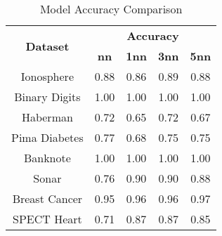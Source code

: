 \begin{table}[htbp]
\caption{Model Accuracy Comparison}
\begin{center}
\begin{tabular}{|c|c|c|c|c|}
\hline
\multirow{2}{*}{\textbf{Dataset}} & \multicolumn{4}{c|}{\textbf{Accuracy}} \\ \cline{2-5}
 & \textbf{nn} & \textbf{1nn} & \textbf{3nn} & \textbf{5nn} \\ \hline
Ionosphere & 0.88 & 0.86 & 0.89 & 0.88 \\ \hline
Binary Digits & 1.00 & 1.00 & 1.00 & 1.00 \\ \hline
Haberman & 0.72 & 0.65 & 0.72 & 0.67 \\ \hline
Pima Diabetes & 0.77 & 0.68 & 0.75 & 0.75 \\ \hline
Banknote & 1.00 & 1.00 & 1.00 & 1.00 \\ \hline
Sonar & 0.76 & 0.90 & 0.90 & 0.88 \\ \hline
Breast Cancer & 0.95 & 0.96 & 0.96 & 0.97 \\ \hline
SPECT Heart & 0.71 & 0.87 & 0.87 & 0.85 \\ \hline
\end{tabular}
\label{tab:accuracy}
\end{center}
\end{table}